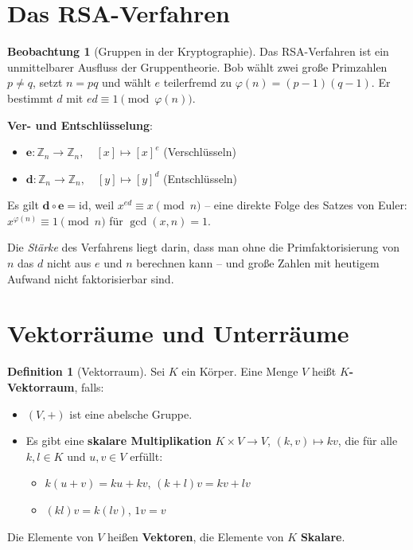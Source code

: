 ﻿\documentclass[a4paper,12pt]{report}
\theoremstyle{definition}
\newtheorem{definition}{Definition}
\newtheorem{beobachtung}{Beobachtung}
\begin{document}
\section{Das RSA-Verfahren}

\begin{beobachtung}[Gruppen in der Kryptographie]
    Das RSA-Verfahren ist ein unmittelbarer Ausfluss der Gruppentheorie.
    Bob wählt zwei große Primzahlen $p \neq q$, setzt $n = pq$ und wählt
    $e$ teilerfremd zu $\varphi(n) = (p-1)(q-1)$. Er bestimmt $d$ mit
    $ed \equiv 1 \pmod{\varphi(n)}$.

    \textbf{Ver- und Entschlüsselung}:
    \begin{itemize}
        \item[-] $\mathbf{e} : \mathbb{Z}_n \to \mathbb{Z}_n, \quad [x] \mapsto [x]^e$ \quad (Verschlüsseln)
        \item[-] $\mathbf{d} : \mathbb{Z}_n \to \mathbb{Z}_n, \quad [y] \mapsto [y]^d$ \quad (Entschlüsseln)
    \end{itemize}
    Es gilt $\mathbf{d} \circ \mathbf{e} = \mathrm{id}$, weil $x^{ed} \equiv x \pmod{n}$
    -- eine direkte Folge des Satzes von Euler: $x^{\varphi(n)} \equiv 1 \pmod{n}$
    für $\gcd(x, n) = 1$.

    Die \emph{Stärke} des Verfahrens liegt darin, dass man ohne die
    Primfaktorisierung von $n$ das $d$ nicht aus $e$ und $n$ berechnen kann --
    und große Zahlen mit heutigem Aufwand nicht faktorisierbar sind.
\end{beobachtung}

\section{Vektorräume und Unterräume}

\begin{definition}[Vektorraum]
    Sei $K$ ein Körper. Eine Menge $V$ heißt \textbf{$K$-Vektorraum}, falls:
    \begin{itemize}
        \item[-] $(V, +)$ ist eine abelsche Gruppe.
        \item[-] Es gibt eine \textbf{skalare Multiplikation}
              $K \times V \to V$, $(k, v) \mapsto kv$, die für alle $k, l \in K$
              und $u, v \in V$ erfüllt:
        \begin{itemize}
            \item[-] $k(u + v) = ku + kv$, \quad $(k + l)v = kv + lv$
            \item[-] $(kl)v = k(lv)$, \quad $1v = v$
        \end{itemize}
    \end{itemize}
    Die Elemente von $V$ heißen \textbf{Vektoren}, die Elemente von $K$
    \textbf{Skalare}.
\end{definition}
\end{document}
